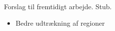 {
{\sffamily Forslag til fremtidigt arbejde. Stub.
}

\begin{itemize}
    \item Bedre udtrækning af regioner
\end{itemize}

%
}


